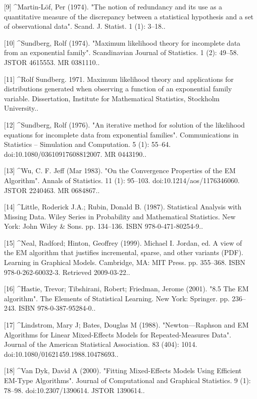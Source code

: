 [9]
^Martin-Löf, Per (1974). "The notion of redundancy and its use as a quantitative measure of the discrepancy between a statistical hypothesis and a set of observational data". Scand. J. Statist. 1 (1): 3–18..

[10]
^Sundberg, Rolf (1974). "Maximum likelihood theory for incomplete data from an exponential family". Scandinavian Journal of Statistics. 1 (2): 49–58. JSTOR 4615553. MR 0381110..

[11]
^Rolf Sundberg. 1971. Maximum likelihood theory and applications for distributions generated when observing a function of an exponential family variable. Dissertation, Institute for Mathematical Statistics, Stockholm University..

[12]
^Sundberg, Rolf (1976). "An iterative method for solution of the likelihood equations for incomplete data from exponential families". Communications in Statistics – Simulation and Computation. 5 (1): 55–64. doi:10.1080/03610917608812007. MR 0443190..

[13]
^Wu, C. F. Jeff (Mar 1983). "On the Convergence Properties of the EM Algorithm". Annals of Statistics. 11 (1): 95–103. doi:10.1214/aos/1176346060. JSTOR 2240463. MR 0684867..

[14]
^Little, Roderick J.A.; Rubin, Donald B. (1987). Statistical Analysis with Missing Data. Wiley Series in Probability and Mathematical Statistics. New York: John Wiley & Sons. pp. 134–136. ISBN 978-0-471-80254-9..

[15]
^Neal, Radford; Hinton, Geoffrey (1999). Michael I. Jordan, ed. A view of the EM algorithm that justifies incremental, sparse, and other variants (PDF). Learning in Graphical Models. Cambridge, MA: MIT Press. pp. 355–368. ISBN 978-0-262-60032-3. Retrieved 2009-03-22..

[16]
^Hastie, Trevor; Tibshirani, Robert; Friedman, Jerome (2001). "8.5 The EM algorithm". The Elements of Statistical Learning. New York: Springer. pp. 236–243. ISBN 978-0-387-95284-0..

[17]
^Lindstrom, Mary J; Bates, Douglas M (1988). "Newton—Raphson and EM Algorithms for Linear Mixed-Effects Models for Repeated-Measures Data". Journal of the American Statistical Association. 83 (404): 1014. doi:10.1080/01621459.1988.10478693..

[18]
^Van Dyk, David A (2000). "Fitting Mixed-Effects Models Using Efficient EM-Type Algorithms". Journal of Computational and Graphical Statistics. 9 (1): 78–98. doi:10.2307/1390614. JSTOR 1390614..

